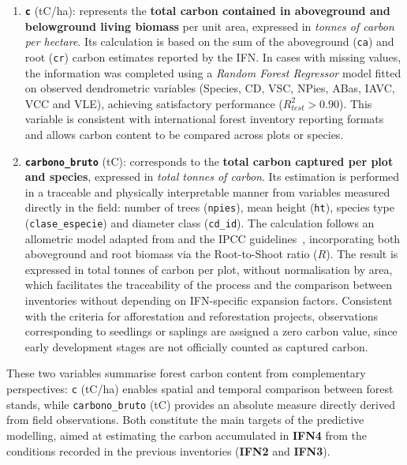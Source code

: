 \begin{enumerate}
    \item \textbf{\texttt{c}} (tC/ha): represents the \textbf{total carbon contained in aboveground and belowground living biomass} per unit area, expressed in \emph{tonnes of carbon per hectare}.
          Its calculation is based on the sum of the aboveground (\texttt{ca}) and root (\texttt{cr}) carbon estimates reported by the IFN.
          In cases with missing values, the information was completed using a \emph{Random Forest Regressor} model fitted on observed dendrometric variables (Species, CD, VSC, NPies, ABas, IAVC, VCC and VLE), achieving satisfactory performance (\(R^2_{test} > 0.90\)).
          This variable is consistent with international forest inventory reporting formats and allows carbon content to be compared across plots or species.


    \item \textbf{\texttt{carbono\_bruto}} (tC): corresponds to the \textbf{total carbon captured per plot and species}, expressed in \emph{total tonnes of carbon}.
          Its estimation is performed in a traceable and physically interpretable manner from variables measured directly in the field: number of trees (\texttt{npies}), mean height (\texttt{ht}), species type (\texttt{clase\_especie}) and diameter class (\texttt{cd\_id}).
          The calculation follows an allometric model adapted from \cite{chave2014} and the IPCC guidelines~\cite{IPCC2006}, incorporating both aboveground and root biomass via the Root-to-Shoot ratio ($R$).
          The result is expressed in total tonnes of carbon per plot, without normalisation by area, which facilitates the traceability of the process and the comparison between inventories without depending on IFN-specific expansion factors.
          Consistent with the criteria for afforestation and reforestation projects, observations corresponding to seedlings or saplings are assigned a zero carbon value, since early development stages are not officially counted as captured carbon.
\end{enumerate}


These two variables summarise forest carbon content from complementary perspectives:
\texttt{c} (tC/ha) enables spatial and temporal comparison between forest stands, while \texttt{carbono\_bruto} (tC) provides an absolute measure directly derived from field observations.
Both constitute the main targets of the predictive modelling, aimed at estimating the carbon accumulated in \textbf{IFN4} from the conditions recorded in the previous inventories (\textbf{IFN2} and \textbf{IFN3}).

